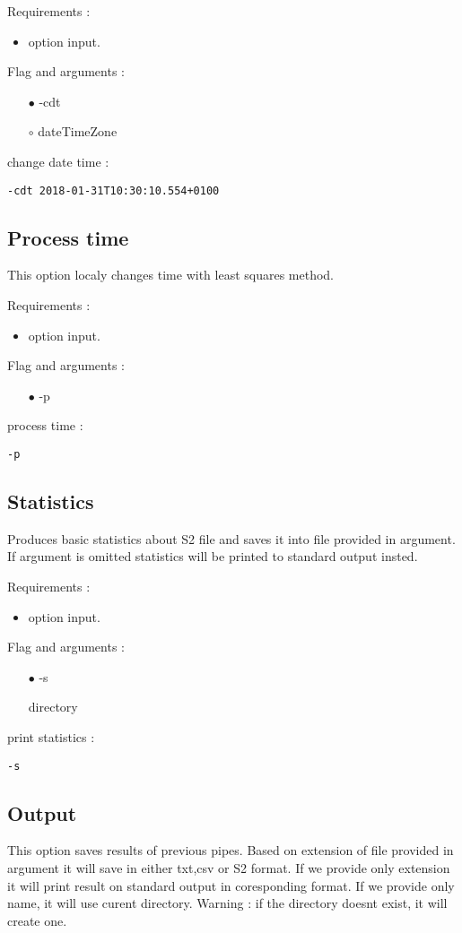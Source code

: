 \documentclass[english]{article}
\begin{document}
\noindent Requirements : 
\begin{itemize}
\item option input. 
\end{itemize}
Flag and arguments :
\begin{itemize}
\item[$\bullet$] -cdt
\item[$\circ$] dateTimeZone
\end{itemize}
change date time : 
\begin{lstlisting} 
-cdt 2018-01-31T10:30:10.554+0100
\end{lstlisting}


\subsection{Process time}
This option localy changes time with least squares method. 

\noindent Requirements : 
\begin{itemize}
\item option input. 
\end{itemize}
Flag and arguments :
\begin{itemize}
\item[$\bullet$] -p
\end{itemize}
process time : 
\begin{lstlisting} 
-p
\end{lstlisting}


\subsection{Statistics}
Produces basic statistics about S2 file and saves it into file provided in argument. If argument is omitted statistics will be printed to standard output insted.

\noindent Requirements : 
\begin{itemize}
\item option input. 
\end{itemize}
Flag and arguments :
\begin{itemize}
\item[$\bullet$] -s
\item[\textasteriskcentered] directory
\end{itemize}
print statistics : 
\begin{lstlisting} 
-s
\end{lstlisting}


\subsection{Output}
This option saves results of previous pipes. Based on extension of file provided in argument it will save in either txt,csv or S2 format. If we provide only extension it will print result on standard output in coresponding format. If we provide only name, it will use curent directory. Warning : if the directory doesnt exist, it will create one.
\end{document}
